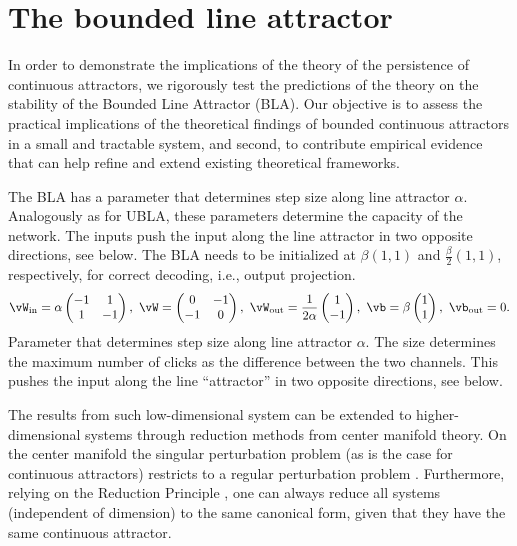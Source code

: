 \documentclass{article} %
\newcounter{ct}
\newcommand{\win}{\vW_{\text{in}}}
\newcommand{\wout}{\vW_{\text{out}}}
\newcommand{\bout}{\vb_{\text{out}}}
\theoremstyle{definition}
\theoremstyle{remark}
\begin{document}
\newpage
\section{The bounded line attractor}\label{sec:supp:bla}
In order to demonstrate the implications of the theory of the persistence of  continuous attractors, we rigorously test the predictions of the theory on the stability of the Bounded Line Attractor (BLA).
Our objective is to assess the practical implications of the theoretical findings of bounded continuous attractors in a small and tractable system, and second, to contribute empirical evidence that can help refine and extend existing theoretical frameworks.

The BLA has a parameter that determines step size along line attractor \(\alpha\). Analogously as for UBLA, these parameters determine the capacity of the network.
The inputs push the input along the line attractor in two opposite directions, see below. The BLA needs to be initialized at \(\beta(1, 1)\) and \(\tfrac{\beta}{2}(1, 1)\), respectively, for correct decoding, i.e., output projection.
\begin{equation}\label{eq:bla}
\win = \alpha
\begin{pmatrix}
-1  &  1 \\
1  &  -1
\end{pmatrix}, \
\vW =
\begin{pmatrix}
0  &  -1 \\
-1  &  0
\end{pmatrix}, \
\wout = \frac{1}{2\alpha}
\begin{pmatrix}
1  \\  -1
\end{pmatrix}, \
\vb = \beta
\begin{pmatrix}
1 \\  1
\end{pmatrix}, \
\bout = 0.
\end{equation}
Parameter that determines step size along line attractor \(\alpha\).
The size determines the maximum number of clicks as the difference between the two channels.
This pushes the input along the line ``attractor'' in two opposite directions, %
see below.


The results from such low-dimensional system can be extended to higher-dimensional systems through reduction methods from center manifold theory.
On the center manifold the singular perturbation problem (as is the case for continuous attractors) restricts to a regular perturbation problem \citep{fenichel1979geometric}. Furthermore, relying on the Reduction Principle \citep{kirchgraber1990geometry}, one can always reduce all systems (independent of dimension) to the same canonical form, given that they have the same continuous attractor.
\end{document}
